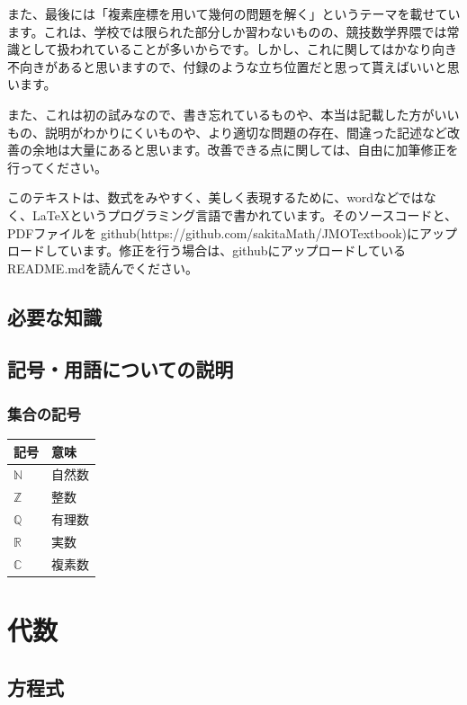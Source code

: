 \documentclass[uplatex,fleqn]{jsbook}
\begin{document}
また、最後には「複素座標を用いて幾何の問題を解く」というテーマを載せています。これは、学校では限られた部分しか習わないものの、競技数学界隈では常識として扱われていることが多いからです。しかし、これに関してはかなり向き不向きがあると思いますので、付録のような立ち位置だと思って貰えばいいと思います。

また、これは初の試みなので、書き忘れているものや、本当は記載した方がいいもの、説明がわかりにくいものや、より適切な問題の存在、間違った記述など改善の余地は大量にあると思います。改善できる点に関しては、自由に加筆修正を行ってください。

このテキストは、数式をみやすく、美しく表現するために、wordなどではなく、\LaTeX というプログラミング言語で書かれています。そのソースコードと、PDFファイルを
github(https://github.com/sakitaMath/JMOTextbook)にアップロードしています。修正を行う場合は、githubにアップロードしているREADME.mdを読んでください。

\section{必要な知識}
\section{記号・用語についての説明}
\subsection{集合の記号}
\begin{table}[h]
    \begin{tabular}{l|l}
        記号 & 意味\\\hline\hline
        $\mathbb{N}$ & 自然数\\
        $\mathbb{Z}$ & 整数\\
        $\mathbb{Q}$ & 有理数\\
        $\mathbb{R}$ & 実数\\
        $\mathbb{C}$ & 複素数\\\hline
    \end{tabular}
\end{table}
\subsection{}

\chapter{代数}
\section{方程式}
\end{document}
